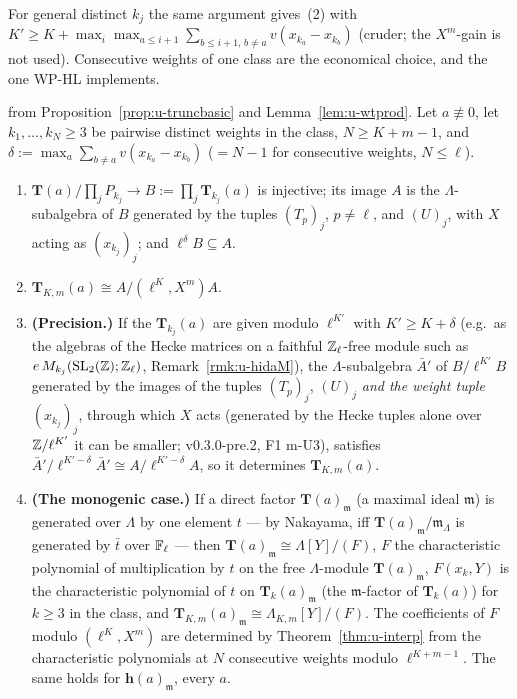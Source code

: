 \documentclass[11pt]{article}
\newcommand{\Iw}{\Lambda}                         %
\newcommand{\hcusp}{\mathbf{h}}                   %
\newcommand{\Tu}{\mathbf{T}}                      %
\newcommand{\Pk}[1]{P_{#1}}                       %
\newcommand{\Zl}{\Z_\ell}
\begin{document}
\noindent For general distinct $k_j$ the same argument gives~(2) with $K'\ge K+\max_{i}\max_{a\le i+1}\sum_{b\le i+1,\,b\ne a}v(x_{k_a}-x_{k_b})$ (cruder; the
$X^{m}$-gain is not used). Consecutive weights of one class are the economical choice, and the one WP-HL implements.

\begin{proposition}\label{prop:u-lambdaprod}
\PROVED{} from Proposition~\ref{prop:u-truncbasic} and Lemma~\ref{lem:u-wtprod}. Let $a\not\equiv0$, let $k_1,\dots,k_N\ge3$ be pairwise distinct weights in
the class, $N\ge K+m-1$, and $\delta:=\max_a\sum_{b\ne a}v(x_{k_a}-x_{k_b})$ ($=N-1$ for consecutive weights, $N\le\ell$).
\begin{enumerate}
\item $\Tu(a)/\prod_j\Pk{k_j}\to B:=\prod_j\Tu_{k_j}(a)$ is injective; its image $A$ is the $\Iw$-subalgebra of $B$ generated by the tuples $(T_p)_j$, $p\ne\ell$, and
  $(U)_j$, with $X$ acting as $(x_{k_j})_j$; and $\ell^{\delta}B\subseteq A$.
\item $\Tu_{K,m}(a)\cong A/(\ell^{K},X^{m})A$.
\item \textbf{(Precision.)} If the $\Tu_{k_j}(a)$ are given modulo $\ell^{K'}$ with $K'\ge K+\delta$ (e.g.\ as the algebras of the Hecke matrices on a faithful
  $\Zl$-free module such as $e\,M_{k_j}(\SL_2(\Z);\Zl)$, Remark~\ref{rmk:u-hidaM}), the $\Iw$-subalgebra $\bar A'$ of $B/\ell^{K'}B$ generated by the images of the tuples $(T_p)_j$, $(U)_j$ \emph{and the weight tuple $(x_{k_j})_j$}, through which $X$
  acts (generated by the Hecke tuples alone over $\mathbb{Z}/\ell^{K'}$ it can be smaller; v0.3.0-pre.2, F1 m-U3),
  satisfies $\bar A'/\ell^{K'-\delta}\bar A'\cong A/\ell^{K'-\delta}A$, so it determines $\Tu_{K,m}(a)$.
\item \textbf{(The monogenic case.)} If a direct factor $\Tu(a)_{\mathfrak m}$ (a maximal ideal $\mathfrak m$) is generated over $\Iw$ by one element $t$ --- by
  Nakayama, iff $\Tu(a)_{\mathfrak m}/\mathfrak m_\Iw$ is generated by $\bar t$ over $\mathbb{F}_\ell$ --- then $\Tu(a)_{\mathfrak m}\cong\Iw[Y]/(F)$, $F$ the characteristic polynomial
  of multiplication by $t$ on the free $\Iw$-module $\Tu(a)_{\mathfrak m}$, $F(x_k,Y)$ is the characteristic polynomial of $t$ on $\Tu_k(a)_{\mathfrak m}$ (the
  $\mathfrak m$-factor of $\Tu_k(a)$) for $k\ge3$ in the class, and $\Tu_{K,m}(a)_{\mathfrak m}\cong\Iw_{K,m}[Y]/(F)$. The coefficients of $F$ modulo $(\ell^{K},X^{m})$ are
  determined by Theorem~\ref{thm:u-interp} from the characteristic polynomials at $N$ consecutive weights modulo $\ell^{K+m-1}$. The same holds for
  $\hcusp(a)_{\mathfrak m}$, every $a$.
\end{enumerate}
\end{proposition}
\end{document}

